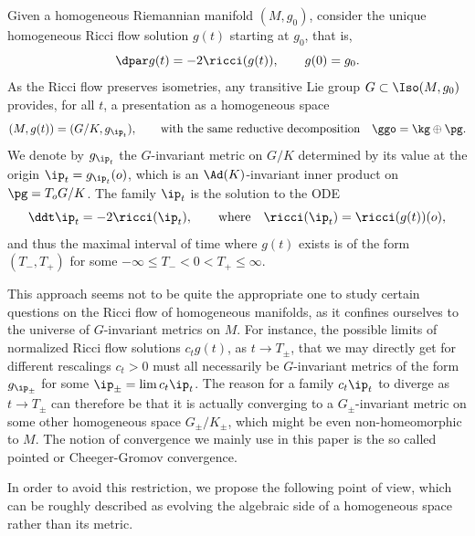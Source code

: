 \documentclass[11pt]{amsart}
\theoremstyle{plain}
\theoremstyle{definition}
\theoremstyle{remark}
\begin{document}
Given a homogeneous Riemannian manifold $(M,g_0)$, consider the unique homogeneous Ricci flow solution $g(t)$ starting at $g_0$, that is,
\begin{equation}\label{RFint}
\dpar g(t)=-2\ricci(g(t)),\qquad g(0)=g_0.
\end{equation}
As the Ricci flow preserves isometries, any transitive Lie group $G\subset\Iso(M,g_0)$ provides, for all $t$, a presentation as a homogeneous space
$$
(M,g(t))=(G/K,g_{\ip_t}), \qquad \mbox{with the same reductive decomposition} \quad \ggo=\kg\oplus\pg.
$$
We denote by $g_{\ip_t}$ the $G$-invariant metric on $G/K$ determined by its value at the origin $\ip_t=g_{\ip_t}(o)$, which is an $\Ad(K)$-invariant inner product on $\pg=T_oG/K$.  The family $\ip_t$ is the solution to the ODE
\begin{equation}\label{RFipint}
\ddt \ip_t=-2\ricci(\ip_t), \qquad\mbox{where}\quad \ricci(\ip_t)=\ricci(g(t))(o),
\end{equation}
and thus the maximal interval of time where $g(t)$ exists is of the form $(T_-,T_+)$ for some $-\infty\leq T_-<0<T_+\leq\infty$.

This approach seems not to be quite the appropriate one to study certain questions on the Ricci flow of homogeneous manifolds, as it confines ourselves to the universe of $G$-invariant metrics on $M$.  For instance, the possible limits of normalized Ricci flow solutions $c_tg(t)$, as $t\to T_{\pm}$, that we may directly get for different rescalings $c_t>0$ must all necessarily be $G$-invariant metrics of the form $g_{\ip_{\pm}}$ for some $\ip_{\pm}=\lim c_t\ip_t$.  The reason for a family $c_t\ip_t$ to diverge as $t\to T_{\pm}$ can therefore be that it is actually converging to a $G_\pm$-invariant metric on some other homogeneous space $G_\pm/K_\pm$, which might be even non-homeomorphic to $M$.  The notion of convergence we mainly use in this paper is the so called pointed or Cheeger-Gromov convergence.

In order to avoid this restriction, we propose the following point of view, which can be roughly described as evolving the algebraic side of a homogeneous space rather than its metric.
\end{document}
